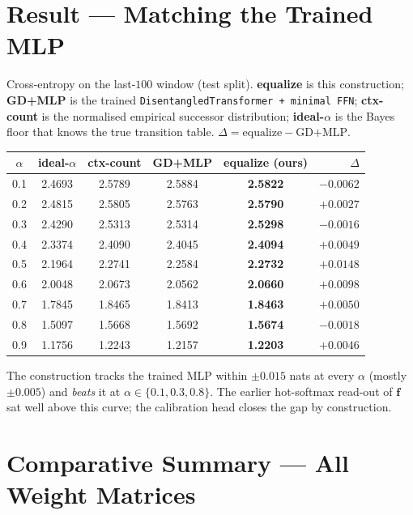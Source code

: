 \documentclass[11pt]{article}
\newcommand{\fvec}{\mathbf{f}}
\begin{document}
\section{Result --- Matching the Trained MLP}
Cross-entropy on the last-$100$ window (test split). \textbf{equalize} is this construction;
\textbf{GD+MLP} is the trained \texttt{DisentangledTransformer + minimal FFN}; \textbf{ctx-count}
is the normalised empirical successor distribution; \textbf{ideal-$\alpha$} is the Bayes floor that
knows the true transition table. $\Delta=\text{equalize}-\text{GD+MLP}$.
\begin{center}\small
\begin{tabular}{@{}cccccr@{}}
\toprule
$\alpha$ & ideal-$\alpha$ & ctx-count & GD+MLP & \textbf{equalize (ours)} & $\Delta$\\
\midrule
0.1 & 2.4693 & 2.5789 & 2.5884 & \textbf{2.5822} & $-0.0062$\\
0.2 & 2.4815 & 2.5805 & 2.5763 & \textbf{2.5790} & $+0.0027$\\
0.3 & 2.4290 & 2.5313 & 2.5314 & \textbf{2.5298} & $-0.0016$\\
0.4 & 2.3374 & 2.4090 & 2.4045 & \textbf{2.4094} & $+0.0049$\\
0.5 & 2.1964 & 2.2741 & 2.2584 & \textbf{2.2732} & $+0.0148$\\
0.6 & 2.0048 & 2.0673 & 2.0562 & \textbf{2.0660} & $+0.0098$\\
0.7 & 1.7845 & 1.8465 & 1.8413 & \textbf{1.8463} & $+0.0050$\\
0.8 & 1.5097 & 1.5668 & 1.5692 & \textbf{1.5674} & $-0.0018$\\
0.9 & 1.1756 & 1.2243 & 1.2157 & \textbf{1.2203} & $+0.0046$\\
\bottomrule
\end{tabular}
\end{center}
The construction tracks the trained MLP within $\pm0.015$ nats at every $\alpha$ (mostly
$\pm0.005$) and \emph{beats} it at $\alpha\in\{0.1,0.3,0.8\}$. The earlier hot-softmax read-out of
$\fvec$ sat well above this curve; the calibration head closes the gap by construction.

\section{Comparative Summary --- All Weight Matrices}
\end{document}
